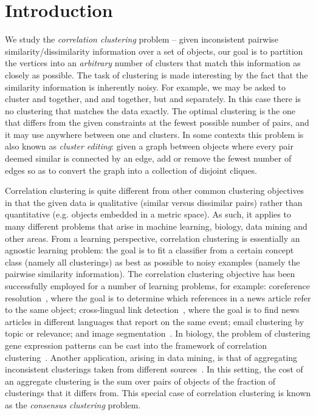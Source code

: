 \documentclass[11pt]{article}
\theoremstyle{definition}
\theoremstyle{remark}
\begin{document}
\section{Introduction}
We study the \textit{correlation clustering} problem -- given inconsistent
pairwise similarity/dissimilarity information over a set of objects, our goal
is to partition the vertices into an \textit{arbitrary} number of clusters
that match this information as closely as possible.
The task of clustering is made interesting by the fact that the similarity
information is inherently noisy. For example, we may be asked to cluster 
and  together, and  and  together, but  and  separately. In this
case there is no clustering that matches the data exactly. The optimal
clustering is the one that differs from the given constraints at the fewest
possible number of pairs, and it may use anywhere between one and  clusters.
In some contexts this problem is also known as \textit{cluster editing}: given a graph
between objects where every pair deemed similar is connected by an edge, add or
remove the fewest number of edges so as to convert the graph into a collection
of disjoint cliques.

Correlation clustering is quite different from other common clustering
objectives in that the given data is qualitative (similar versus
dissimilar pairs) rather than quantitative (e.g. objects embedded in a
metric space). As such, it applies to many different problems that
arise in machine learning, biology, data mining and other areas. From
a learning perspective, correlation clustering is essentially an
agnostic learning problem: the goal is to fit a classifier from a
certain concept class (namely all clusterings) as best as possible to
noisy examples (namely the pairwise similarity information). The
correlation clustering objective has been successfully employed for a
number of learning problems, for example: coreference
resolution~\cite{CR01, CR02, MW03},
where the goal is to determine which references in a news article
refer to the same object; cross-lingual link detection~\cite{VZ07},
where the goal is to find news articles in different languages that
report on the same event; email clustering by topic or relevance; and
image segmentation~\cite{Wirth10}. In biology, the problem of clustering gene
expression patterns can be cast into the framework of correlation
clustering~\cite{DSY99, A04}. Another application, arising in data
mining, is that of aggregating inconsistent clusterings taken from
different sources~\cite{Fil03}. In this setting, the cost of an aggregate
clustering is the sum over pairs of objects of the fraction of
clusterings that it differs from. This special case of correlation
clustering is known as the \textit{consensus clustering} problem.
\end{document}
